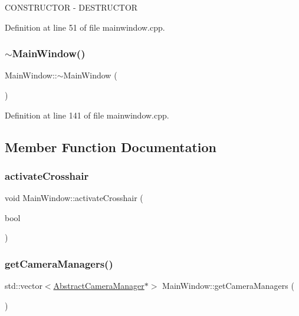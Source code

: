 C\+O\+N\+S\+T\+R\+U\+C\+T\+OR -\/ D\+E\+S\+T\+R\+U\+C\+T\+OR 

Definition at line 51 of file mainwindow.\+cpp.

\mbox{\label{class_main_window_ae98d00a93bc118200eeef9f9bba1dba7}} 
\subsubsection{\texorpdfstring{$\sim$MainWindow()}{~MainWindow()}}
{\footnotesize\ttfamily Main\+Window\+::$\sim$\+Main\+Window (\begin{DoxyParamCaption}{ }\end{DoxyParamCaption})}



Definition at line 141 of file mainwindow.\+cpp.



\subsection{Member Function Documentation}
\mbox{\label{class_main_window_a8aca5460ce992afb3fcba398cc387466}} 
\subsubsection{\texorpdfstring{activateCrosshair}{activateCrosshair}}
{\footnotesize\ttfamily void Main\+Window\+::activate\+Crosshair (\begin{DoxyParamCaption}\item[{bool}]{ }\end{DoxyParamCaption})\hspace{0.3cm}{\ttfamily [signal]}}

\mbox{\label{class_main_window_af6bc85f58060fbcd3ea4b0e6cdc5425a}} 
\subsubsection{\texorpdfstring{getCameraManagers()}{getCameraManagers()}}
{\footnotesize\ttfamily std\+::vector$<$\mbox{\hyperlink{class_abstract_camera_manager}{Abstract\+Camera\+Manager}}$\ast$$>$ Main\+Window\+::get\+Camera\+Managers (\begin{DoxyParamCaption}{ }\end{DoxyParamCaption})}

